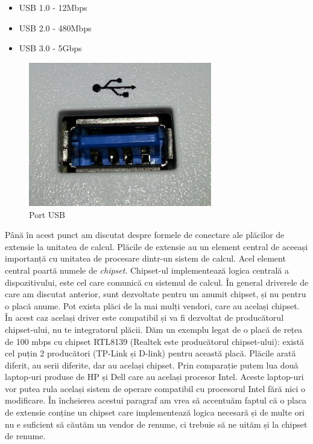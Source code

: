 \begin{itemize}
	\item USB 1.0 - 12Mbps
	\item USB 2.0 - 480Mbps
	\item USB 3.0 - 5Gbps
\end{itemize}

\begin{figure}[!htbp]
	\centering
	\includegraphics[width=8cm]{chapters/08-hw/img/usb-img.png}
	\caption{Port USB\protect\footnotemark}
	\label{fig:hw-usb}
\end{figure}


Până în acest punct am discutat despre formele de conectare ale plăcilor de
extensie la unitatea de calcul. Plăcile de extensie au un element central de
aceeași importanță cu unitatea de procesare dintr-un sistem de calcul. Acel
element central poartă numele de \textit{chipset}. Chipset-ul implementează logica
centrală a dispozitivului, este cel care comunică cu sistemul de calcul. În
general driverele de care am discutat anterior, sunt dezvoltate pentru un anumit
chipset, și nu pentru o placă anume. Pot exista plăci de la mai mulți vendori,
care au același chipset. În acest caz același driver este compatibil și va fi
dezvoltat de producătorul chipset-ului, nu te integratorul plăcii. Dăm un
exemplu legat de o placă de rețea de 100 mbps cu chipset RTL8139 (Realtek este
producătorul chipset-ului): există cel puțin 2 producători (TP-Link și D-link)
pentru această placă. Plăcile arată diferit, au serii diferite, dar au același
chipset. Prin comparație putem lua două laptop-uri produse de HP și Dell care au
același procesor Intel. Aceste laptop-uri vor putea rula același sistem de
operare compatibil cu procesorul Intel fără nici o modificare. În încheierea
acestui paragraf am vrea să accentuăm faptul că o placa de extensie conține un
chipset care implementează logica necesară și de multe ori nu e suficient să
căutăm un vendor de renume, ci trebuie să ne uităm și la chipset de renume.


